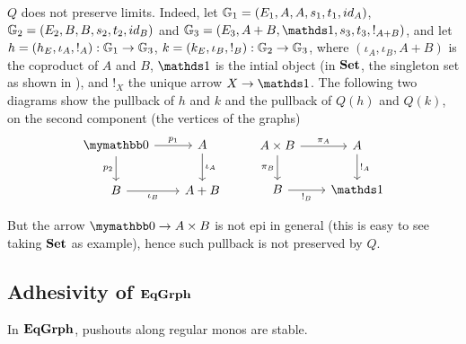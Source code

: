 \begin{example}
	$Q$ does not preserve limits. Indeed, let $\mathbb{G}_1 = (E_1, A, A, s_1, t_1, id_A)$, $\mathbb{G}_2 = (E_2, B, B, s_2, t_2, id_B)$ and $\eqgraph{G}_3 = (E_3, A + B, \terminal, s_3, t_3, !_{A + B})$, and let $h = (h_E, \iota_A, !_A): \mathbb{G}_1 \to \mathbb{G}_3$, $k = (k_E, \iota_B, !_B): \mathbb{G}_2 \to \mathbb{G}_3$, where $(\iota_A, \iota_B, A + B)$ is the coproduct of $A$ and $B$, $\terminal$ is the intial object (in $\mathbf{Set}$, the singleton set as shown in ), and $!_X$ the unique arrow $X \to \terminal$.
	The following two diagrams show the pullback of $h$ and $k$ and the pullback of $Q(h)$ and $Q(k)$, on the second component (the vertices of the graphs)
	\[\begin{tikzcd}[row sep = 20, column sep = 20]
		\initial \ar[r, "{p_1}"] \ar[d, "{p_2}" swap] & A \ar[d, "{\iota_A}"] \\
		B \ar[r, "{\iota_B}"swap] & A+B
	\end{tikzcd}\
	\qquad
	\begin{tikzcd}[row sep = 20, column sep = 20]
		{A \times B} \ar[r, "{\pi_A}"] \ar[d, "{\pi_B}"swap] & A \ar[d, "{!_A}"] \\
		B \ar[r, "{!_B}"swap] & \terminal
	\end{tikzcd}\]

	But the arrow $\initial \to A\times B$ is not epi in general (this is easy to see taking $\mathbf{Set}$ as example), hence such pullback is not preserved by $Q$.
\end{example}


\subsection{Adhesivity of $\mathbf{EqGrph}$}

\begin{lemma}\label{lemma:stab}
	In $\mathbf{EqGrph}$, pushouts along regular monos are stable.
\end{lemma}

